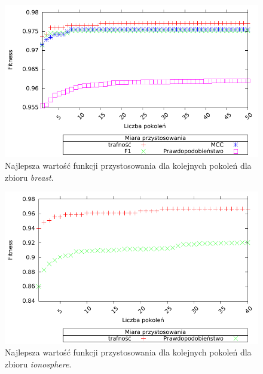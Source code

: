 	\begin{figure}
		\includegraphics[scale=0.90]{figures/results/fitness/fitness-breast}
		\caption{Najlepsza wartość funkcji przystosowania dla kolejnych pokoleń dla zbioru \emph{breast}.\label{fig:fit-breast}}
	\end{figure}	
	
        \begin{figure}
                \includegraphics[scale=0.90]{figures/results/fitness/fitness-ionosphere}
                \caption{Najlepsza wartość funkcji przystosowania dla kolejnych pokoleń dla zbioru \emph{ionosphere}.\label{fig:fit-ionosphere}}
        \end{figure}    
               
